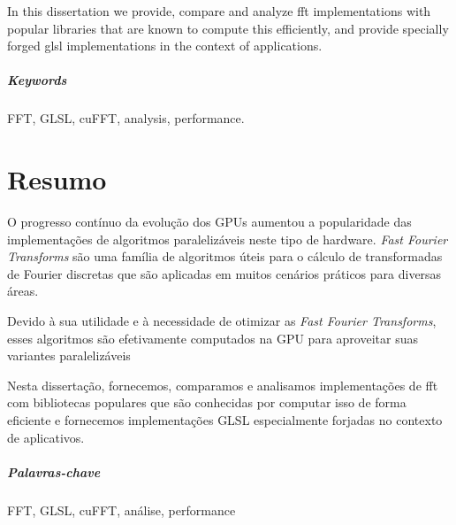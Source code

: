 \documentclass[
  oneside,
  11pt, a4paper,
  footinclude=true,
  headinclude=true,
  cleardoublepage=empty
]{scrbook}
\begin{document}
In this dissertation we provide, compare and analyze \acrshort{fft} implementations with popular libraries that are known to compute this efficiently, and provide specially forged \acrshort{glsl} implementations in the context of applications.

\paragraph{Keywords} FFT, GLSL, cuFFT, analysis, performance.

    \cleardoublepage


\chapter*{Resumo}

O progresso contínuo da evolução dos GPUs aumentou a popularidade das implementações de algoritmos paralelizáveis neste tipo de hardware.
\textit{Fast Fourier Transforms} são uma família de algoritmos úteis para o cálculo de transformadas de Fourier discretas que são aplicadas em muitos cenários práticos para diversas áreas.

Devido à sua utilidade e à necessidade de otimizar as \textit{Fast Fourier Transforms}, esses algoritmos são efetivamente computados na GPU para aproveitar suas variantes paralelizáveis

Nesta dissertação, fornecemos, comparamos e analisamos implementações de \acrshort{fft} com bibliotecas populares que são conhecidas por computar isso de forma eficiente e fornecemos implementações GLSL especialmente forjadas no contexto de aplicativos.
    
\paragraph{Palavras-chave} FFT, GLSL, cuFFT, análise, performance


    \cleardoublepage
    
    \setcounter{page}{3}
    
    \cleardoublepage
    \tableofcontents
    
    \cleardoublepage
    \listoffigures
    
    \cleardoublepage
    \listoftables
            
\end{document}
